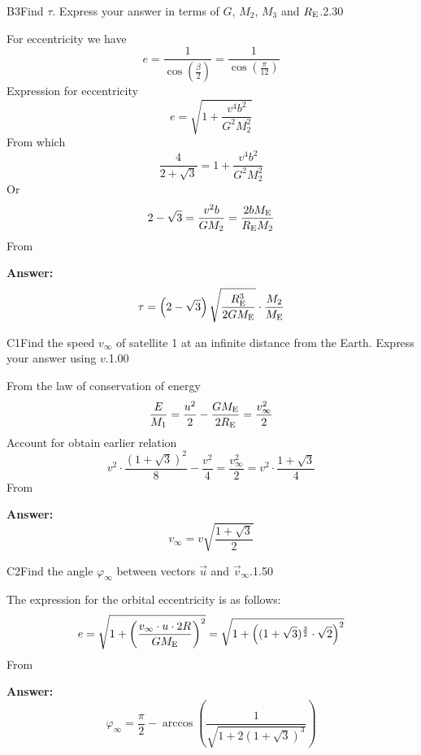 \documentclass[11pt,a4paper]{article}
\begin{document}
\begin{solcard}{B3}{Find $\tau$. Express your answer in terms of $G$, $M_2$, $M_3$ and $R_\text{\text{E}}$.}{2.30}

For eccentricity we have $$e=\frac{1}{\cos\left(\frac{\beta}{2}\right)}=\frac{1}{\cos\left(\frac{\pi}{12}\right)} $$ Expression for eccentricity $$e=\sqrt{1+\frac{v^4b^2}{G^2M^2_2}} $$ From which $$\frac{4}{2+\sqrt{3}}=1+\frac{v^4b^2}{G^2M^2_2} $$ Or $$2-\sqrt{3}=\frac{v^2b}{GM_2}=\frac{2bM_\text{\text{E}}}{R_\text{\text{E}}M_2} $$ From

\par\smallskip\noindent\textbf{Answer:} $$\tau=\left(2-\sqrt{3}\right)\sqrt{\frac{R^3_\text{\text{E}}}{2GM_\text{\text{E}}}}\cdot{\frac{M_2}{M_\text{\text{E}}}} $$
\end{solcard}

\begin{solcard}{C1}{Find the speed $v_\infty$ of satellite 1 at an infinite distance from the Earth. Express your answer using $v$.}{1.00}

From the law of conservation of energy $$\frac{E}{M_1}=\frac{u^2}{2}-\frac{GM_\text{\text{E}}}{2R_\text{\text{E}}}=\frac{v^2_\infty}{2} $$ Account for obtain earlier relation $$v^2\cdot{\frac{(1+\sqrt{3})^2}{8}}-\frac{v^2}{4}=\frac{v^2_\infty}{2}=v^2\cdot{\frac{1+\sqrt{3}}{4}} $$ From

\par\smallskip\noindent\textbf{Answer:} $$v_\infty=v\sqrt{\frac{1+\sqrt{3}}{2}} $$
\end{solcard}

\begin{solcard}{C2}{Find the angle $\varphi_\infty$ between vectors $\vec{u}$ and $\vec{v}_\infty$.}{1.50}

The expression for the orbital eccentricity is as follows: $$e=\sqrt{1+\left(\frac{{v_\infty}\cdot{u}\cdot{2R}}{GM_\text{\text{E}}}\right)^2}=\sqrt{1+\left((1+\sqrt{3})^{\frac{3}{2}}\cdot{\sqrt{2}}\right)^2} $$ From

\par\smallskip\noindent\textbf{Answer:} $$\varphi_\infty=\frac{\pi}{2}-\arccos\left(\frac{1}{\sqrt{1+2(1+\sqrt{3})^3}}\right) $$
\end{solcard}
\end{document}
